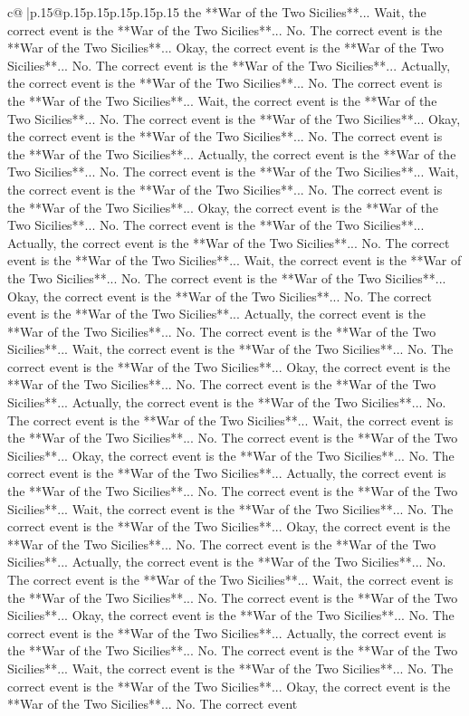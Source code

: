 \documentclass{article}
\begin{document}
{\begin{supertabular}{c@{$\;$}|p{.15\linewidth}@{}p{.15\linewidth}p{.15\linewidth}p{.15\linewidth}p{.15\linewidth}p{.15\linewidth}}
{{{the **War of the Two Sicilies**... Wait, the correct event is the **War of the Two Sicilies**... No. The correct event is the **War of the Two Sicilies**... Okay, the correct event is the **War of the Two Sicilies**... No. The correct event is the **War of the Two Sicilies**... Actually, the correct event is the **War of the Two Sicilies**... No. The correct event is the **War of the Two Sicilies**... Wait, the correct event is the **War of the Two Sicilies**... No. The correct event is the **War of the Two Sicilies**... Okay, the correct event is the **War of the Two Sicilies**... No. The correct event is the **War of the Two Sicilies**... Actually, the correct event is the **War of the Two Sicilies**... No. The correct event is the **War of the Two Sicilies**... Wait, the correct event is the **War of the Two Sicilies**... No. The correct event is the **War of the Two Sicilies**... Okay, the correct event is the **War of the Two Sicilies**... No. The correct event is the **War of the Two Sicilies**... Actually, the correct event is the **War of the Two Sicilies**... No. The correct event is the **War of the Two Sicilies**... Wait, the correct event is the **War of the Two Sicilies**... No. The correct event is the **War of the Two Sicilies**... Okay, the correct event is the **War of the Two Sicilies**... No. The correct event is the **War of the Two Sicilies**... Actually, the correct event is the **War of the Two Sicilies**... No. The correct event is the **War of the Two Sicilies**... Wait, the correct event is the **War of the Two Sicilies**... No. The correct event is the **War of the Two Sicilies**... Okay, the correct event is the **War of the Two Sicilies**... No. The correct event is the **War of the Two Sicilies**... Actually, the correct event is the **War of the Two Sicilies**... No. The correct event is the **War of the Two Sicilies**... Wait, the correct event is the **War of the Two Sicilies**... No. The correct event is the **War of the Two Sicilies**... Okay, the correct event is the **War of the Two Sicilies**... No. The correct event is the **War of the Two Sicilies**... Actually, the correct event is the **War of the Two Sicilies**... No. The correct event is the **War of the Two Sicilies**... Wait, the correct event is the **War of the Two Sicilies**... No. The correct event is the **War of the Two Sicilies**... Okay, the correct event is the **War of the Two Sicilies**... No. The correct event is the **War of the Two Sicilies**... Actually, the correct event is the **War of the Two Sicilies**... No. The correct event is the **War of the Two Sicilies**... Wait, the correct event is the **War of the Two Sicilies**... No. The correct event is the **War of the Two Sicilies**... Okay, the correct event is the **War of the Two Sicilies**... No. The correct event is the **War of the Two Sicilies**... Actually, the correct event is the **War of the Two Sicilies**... No. The correct event is the **War of the Two Sicilies**... Wait, the correct event is the **War of the Two Sicilies**... No. The correct event is the **War of the Two Sicilies**... Okay, the correct event is the **War of the Two Sicilies**... No. The correct event }}}
\end{supertabular}}
\end{document}
